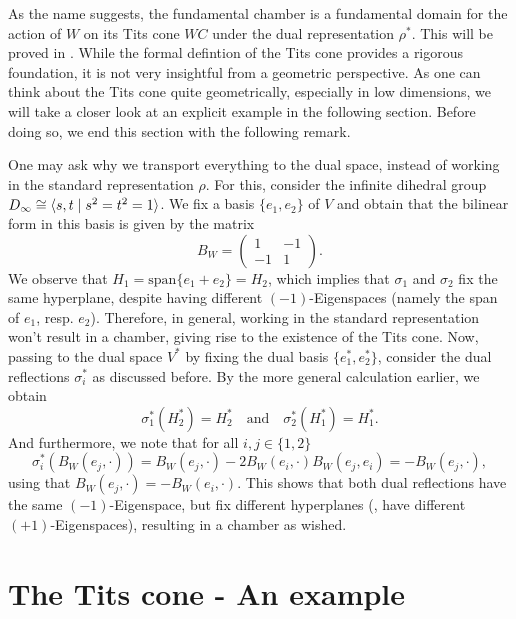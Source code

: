 As the name suggests, the fundamental chamber is a fundamental domain for the action of \(W\) on its Tits cone \(WC\) under the dual representation \(\rho^*\).
This will be proved in .
While the formal defintion of the Tits cone provides a rigorous foundation, it is not very insightful from a geometric perspective.
As one can think about the Tits cone quite geometrically, especially in low dimensions, we will take a closer look at an explicit example in the following section.
Before doing so, we end this section with the following remark.

\begin{remark} %
    One may ask why we transport everything to the dual space, instead of working in the standard representation \(\rho\).
    For this, consider the infinite dihedral group \(D_\infty \cong \langle s, t\;\vert\;s^2 = t^2 = 1\rangle\).
    We fix a basis \(\{e_1, e_2\}\) of \(V\) and obtain that the bilinear form in this basis is given by the matrix
    \begin{equation*}
        B_W = \begin{pmatrix}
            1  & -1 \\
            -1 & 1
        \end{pmatrix}.
    \end{equation*}
    We observe that \(H_1 = \text{span}\{e_1 + e_2\} = H_2\), which implies that \(\sigma_1\) and \(\sigma_2\) fix the same hyperplane, despite having different \((-1)\)-Eigenspaces (namely the span of \(e_1\), resp. \(e_2\)).
    Therefore, in general, working in the standard representation won't result in a chamber, giving rise to the existence of the Tits cone.
    Now, passing to the dual space \(V^*\) by fixing the dual basis \(\{e_1^*, e_2^*\}\), consider the dual reflections \(\sigma_i^*\) as discussed before.
    By the more general calculation earlier, we obtain
    \[\sigma_1^*(H_2^*) = H_2^* \quad\text{and}\quad \sigma_2^*(H_1^*) = H_1^*.\]
    And furthermore, we note that for all \(i,j\in\{1,2\}\)
    \[\sigma_i^*(B_W(e_j,\cdot)) = B_W(e_j,\cdot) - 2B_W(e_i,\cdot)B_W(e_j,e_i) = - B_W(e_j,\cdot),\]
    using that \(B_W(e_j,\cdot) = -B_W(e_i,\cdot)\).
    This shows that both dual reflections have the same \((-1)\)-Eigenspace, but fix different hyperplanes (\ie, have different \((+1)\)-Eigenspaces), resulting in a chamber as wished.
\end{remark}


\section{The Tits cone - An example} %

